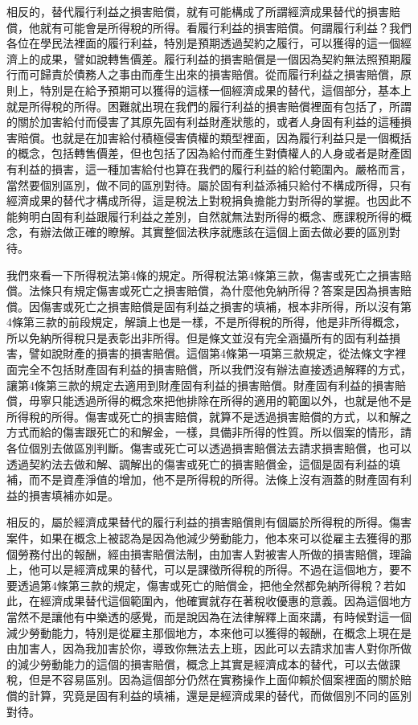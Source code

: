\documentclass[]{ctexbook}
\begin{document}
相反的，替代履行利益之損害賠償，就有可能構成了所謂經濟成果替代的損害賠償，他就有可能會是所得稅的所得。看履行利益的損害賠償。何謂履行利益？我們各位在學民法裡面的履行利益，特別是預期透過契約之履行，可以獲得的這一個經濟上的成果，譬如說轉售價差。履行利益的損害賠償是一個因為契約無法照預期履行而可歸責於債務人之事由而產生出來的損害賠償。從而履行利益之損害賠償，原則上，特別是在給予預期可以獲得的這樣一個經濟成果的替代，這個部分，基本上就是所得稅的所得。困難就出現在我們的履行利益的損害賠償裡面有包括了，所謂的關於加害給付而侵害了其原先固有利益財產狀態的，或者人身固有利益的這種損害賠償。也就是在加害給付積極侵害債權的類型裡面，因為履行利益只是一個概括的概念，包括轉售價差，但也包括了因為給付而產生對債權人的人身或者是財產固有利益的損害，這一種加害給付也算在我們的履行利益的給付範圍內。嚴格而言，當然要個別區別，做不同的區別對待。屬於固有利益添補只給付不構成所得，只有經濟成果的替代才構成所得，這是稅法上對稅捐負擔能力對所得的掌握。也因此不能夠明白固有利益跟履行利益之差別，自然就無法對所得的概念、應課稅所得的概念，有辦法做正確的瞭解。其實整個法秩序就應該在這個上面去做必要的區別對待。

我們來看一下所得稅法第4條的規定。所得稅法第4條第三款，傷害或死亡之損害賠償。法條只有規定傷害或死亡之損害賠償，為什麼他免納所得？答案是因為損害賠償。因傷害或死亡之損害賠償是固有利益之損害的填補，根本非所得，所以沒有第4條第三款的前段規定，解讀上也是一樣，不是所得稅的所得，他是非所得概念，所以免納所得稅只是表彰出非所得。但是條文並沒有完全涵攝所有的固有利益損害，譬如說財產的損害的損害賠償。這個第4條第一項第三款規定，從法條文字裡面完全不包括財產固有利益的損害賠償，所以我們沒有辦法直接透過解釋的方式，讓第4條第三款的規定去適用到財產固有利益的損害賠償。財產固有利益的損害賠償，毋寧只能透過所得的概念來把他排除在所得的適用的範圍以外，也就是他不是所得稅的所得。傷害或死亡的損害賠償，就算不是透過損害賠償的方式，以和解之方式而給的傷害跟死亡的和解金，一樣，具備非所得的性質。所以個案的情形，請各位個別去做區別判斷。傷害或死亡可以透過損害賠償法去請求損害賠償，也可以透過契約法去做和解、調解出的傷害或死亡的損害賠償金，這個是固有利益的填補，而不是資產淨值的增加，他不是所得稅的所得。法條上沒有涵蓋的財產固有利益的損害填補亦如是。

相反的，屬於經濟成果替代的履行利益的損害賠償則有個屬於所得稅的所得。傷害案件，如果在概念上被認為是因為他減少勞動能力，他本來可以從雇主去獲得的那個勞務付出的報酬，經由損害賠償法制，由加害人對被害人所做的損害賠償，理論上，他可以是經濟成果的替代，可以是課徵所得稅的所得。不過在這個地方，要不要透過第4條第三款的規定，傷害或死亡的賠償金，把他全然都免納所得稅？若如此，在經濟成果替代這個範圍內，他確實就存在著稅收優惠的意義。因為這個地方當然不是讓他有中樂透的感覺，而是說因為在法律解釋上面來講，有時候對這一個減少勞動能力，特別是從雇主那個地方，本來他可以獲得的報酬，在概念上現在是由加害人，因為我加害於你，導致你無法去上班，因此可以去請求加害人對你所做的減少勞動能力的這個的損害賠償，概念上其實是經濟成本的替代，可以去做課稅，但是不容易區別。因為這個部分仍然在實務操作上面仰賴於個案裡面的關於賠償的計算，究竟是固有利益的填補，還是是經濟成果的替代，而做個別不同的區別對待。
\end{document}
